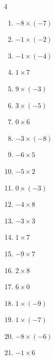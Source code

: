\begin{multicols}{4}
\begin{enumerate}
  \item $-8\times (-7)$
        \phantom{$=56$}

  \item $-1\times (-2)$
        \phantom{$=2$}

  \item $-1\times (-4)$
        \phantom{$=4$}

  \item $1\times 7$
        \phantom{$=7$}

  \item $9\times (-3)$
        \phantom{$=-27$}

  \item $3\times (-5)$
        \phantom{$=-15$}

  \item $0\times 6$
        \phantom{$=0$}

  \item $-3\times (-8)$
        \phantom{$=24$}

  \item $-6\times 5$
        \phantom{$=-30$}

  \item $-5\times 2$
        \phantom{$=-10$}

  \item $0\times (-3)$
        \phantom{$=0$}

  \item $-4\times 8$
        \phantom{$=-32$}

  \item $-3\times 3$
        \phantom{$=-9$}

  \item $1\times 7$
        \phantom{$=7$}

  \item $-9\times 7$
        \phantom{$=-63$}

  \item $2\times 8$
        \phantom{$=16$}

  \item $6\times 0$
        \phantom{$=0$}

  \item $1\times (-9)$
        \phantom{$=-9$}

  \item $1\times (-7)$
        \phantom{$=-7$}

  \item $-8\times (-6)$
        \phantom{$=48$}

  \item $-1\times 6$
        \phantom{$=-6$}


\end{enumerate}
\end{multicols}
